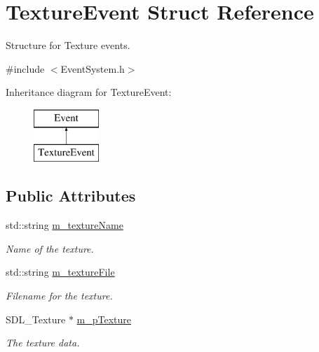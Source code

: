 \hypertarget{struct_texture_event}{}\section{Texture\+Event Struct Reference}
\label{struct_texture_event}


Structure for Texture events.  




{\ttfamily \#include $<$Event\+System.\+h$>$}

Inheritance diagram for Texture\+Event\+:\begin{figure}[H]
\begin{center}
\leavevmode
\includegraphics[height=2.000000cm]{struct_texture_event}
\end{center}
\end{figure}
\subsection*{Public Attributes}
\begin{DoxyCompactItemize}
\item 
\mbox{\label{struct_texture_event_afa021414f511cb7cdc7d6a2b0ac11a11}} 
std\+::string \mbox{\hyperlink{struct_texture_event_afa021414f511cb7cdc7d6a2b0ac11a11}{m\+\_\+texture\+Name}}
\begin{DoxyCompactList}\small\item\em Name of the texture. \end{DoxyCompactList}\item 
\mbox{\label{struct_texture_event_a7233f36930918ea417d2a7eeb2c42be2}} 
std\+::string \mbox{\hyperlink{struct_texture_event_a7233f36930918ea417d2a7eeb2c42be2}{m\+\_\+texture\+File}}
\begin{DoxyCompactList}\small\item\em Filename for the texture. \end{DoxyCompactList}\item 
\mbox{\label{struct_texture_event_ae5935726537c85a83447eb527e8a59a1}} 
S\+D\+L\+\_\+\+Texture $\ast$ \mbox{\hyperlink{struct_texture_event_ae5935726537c85a83447eb527e8a59a1}{m\+\_\+p\+Texture}}
\begin{DoxyCompactList}\small\item\em The texture data. \end{DoxyCompactList}\end{DoxyCompactItemize}
